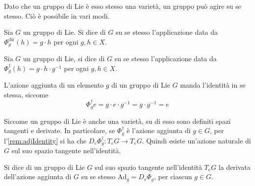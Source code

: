 Dato che un gruppo di Lie è esso stesso una varietà, un gruppo può agire su se stesso. Ciò è possibile in vari modi.

\begin{definition}
  Sia $G$ un gruppo di Lie. Si dice  di $G$ su se stesso l'applicazione data da $\Phi^{\text{dir}}_g(h) = g \cdot h$ per ogni $g,h \in X$.
\end{definition}
\begin{definition}
  Sia $G$ un gruppo di Lie, si dice  di $G$ su se stesso l'applicazione data da $\Phi^{\dagger}_g(h) = g \cdot h \cdot g^{-1}$ per ogni $g,h \in X$.
\end{definition}
\begin{remark} \label{rem:adjIdentity}
  L'azione aggiunta di un elemento $g$ di un gruppo di Lie $G$ manda l'identità in se stessa, siccome \begin{equation*}
  \Phi^{\dagger}_g e = g\cdot e\cdot g^{-1} = g\cdot g^{-1} = e
  \end{equation*} 
\end{remark}

Siccome un gruppo di Lie è anche una varietà, su di esso sono definiti spazi tangenti e derivate. In particolare, se $\Phi^{\dagger}_g$ è l'azione aggiunta di $g \in G$, per l'\autoref{rem:adjIdentity} si ha che $D_e \Phi^{\dagger}_g: T_e G \to T_e G$. Quindi esiste un'azione naturale di $G$ sul suo spazio tangente nell'identità.
\begin{definition}
  Si dice  di un gruppo di Lie $G$ sul suo spazio tangente nell'identità $T_e G$ la derivata dell'azione aggiunta di $G$ su se stesso $\mathrm{Ad}_g = D_e \Phi_g$, per ciascun $g \in G$. 
\end{definition}

